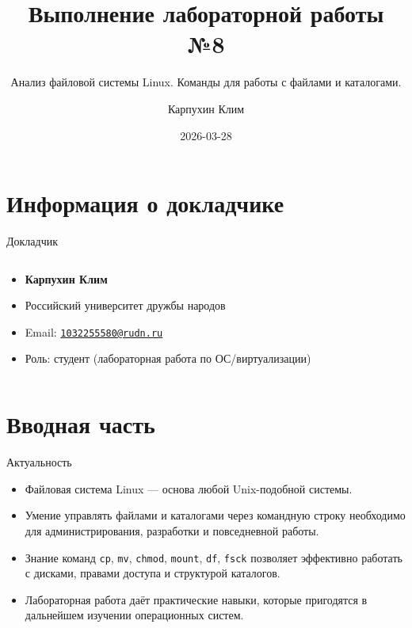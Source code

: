 \documentclass[
  ignorenonframetext,
  aspectratio=169,
  russian,
  aspectratio=169]{beamer}
\title{\texorpdfstring{Выполнение лабораторной работы
№8}{Выполнение лабораторной работы №8}}
\subtitle{\texorpdfstring{Анализ файловой системы Linux. Команды для
работы с файлами и
каталогами.}{Анализ файловой системы Linux. Команды для работы с файлами и каталогами.}}
\author{Карпухин Клим}
\date{2026-03-28}
\providecommand{\tightlist}{%
  \setlength{\itemsep}{0pt}\setlength{\parskip}{0pt}}
\begin{document}
\frame{\titlepage}


\section{Информация о
докладчике}\label{ux438ux43dux444ux43eux440ux43cux430ux446ux438ux44f-ux43e-ux434ux43eux43aux43bux430ux434ux447ux438ux43aux435}

\begin{frame}{Докладчик}
\protect{}\label{ux434ux43eux43aux43bux430ux434ux447ux438ux43a}
\begin{columns}[c]
\begin{column}{0.65\linewidth}
\begin{itemize}[<+->]
\tightlist
\item
  \textbf{Карпухин Клим}
\item
  Российский университет дружбы народов
\item
  Email:
  \href{mailto:1032255580@rudn.ru}{\nolinkurl{1032255580@rudn.ru}}
\item
  Роль: студент (лабораторная работа по ОС/виртуализации)
\end{itemize}
\end{column}
\end{columns}
\end{frame}

\section{Вводная
часть}\label{ux432ux432ux43eux434ux43dux430ux44f-ux447ux430ux441ux442ux44c}

\begin{frame}[fragile]{Актуальность}
\protect{}\label{ux430ux43aux442ux443ux430ux43bux44cux43dux43eux441ux442ux44c}
\begin{itemize}[<+->]
\tightlist
\item
  Файловая система Linux --- основа любой Unix-подобной системы.
\item
  Умение управлять файлами и каталогами через командную строку
  необходимо для администрирования, разработки и повседневной работы.
\item
  Знание команд \texttt{cp}, \texttt{mv}, \texttt{chmod},
  \texttt{mount}, \texttt{df}, \texttt{fsck} позволяет эффективно
  работать с дисками, правами доступа и структурой каталогов.
\item
  Лабораторная работа даёт практические навыки, которые пригодятся в
  дальнейшем изучении операционных систем.
\end{itemize}
\end{frame}
\end{document}
